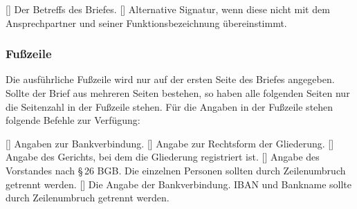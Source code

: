 \documentclass[
    a4paper,
    12pt,
    parskip=half,
]{scrartcl}
\begin{document}
        \begin{commands}
            [] Der Betreffs des Briefes.
            [] Alternative Signatur, wenn diese nicht mit dem Ansprechpartner und seiner Funktionsbezeichnung übereinstimmt.
        \end{commands}

    \subsubsection{Fußzeile}
        Die ausführliche Fußzeile wird nur auf der ersten Seite des Briefes angegeben. Sollte der Brief aus mehreren Seiten bestehen, so haben alle folgenden Seiten nur die Seitenzahl in der Fußzeile stehen. Für die Angaben in der Fußzeile stehen folgende Befehle zur Verfügung:

        \begin{commands}
            [] Angaben zur Bankverbindung.
            [] Angabe zur Rechtsform der Gliederung.
            [] Angabe des Gerichts, bei dem die Gliederung registriert ist.
            [] Angabe des Vorstandes nach §\,26 BGB. Die einzelnen Personen sollten durch Zeilenumbruch getrennt werden.
            [] Die Angabe der Bankverbindung. IBAN und Bankname sollte durch Zeilenumbruch getrennt werden.
        \end{commands}
\end{document}
